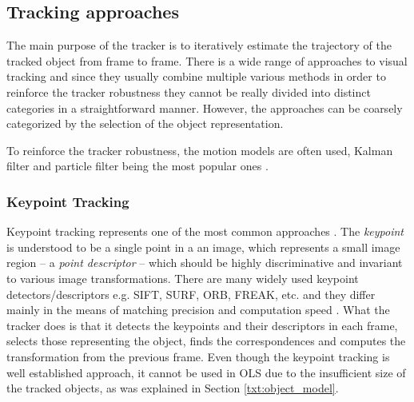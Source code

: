 \subsection{Tracking approaches}

The main purpose of the tracker is to iteratively estimate the trajectory of the tracked object from frame to frame. There is a wide range of approaches to visual tracking and since they usually combine multiple various methods in order to reinforce the tracker robustness they cannot be really divided into distinct categories in a straightforward manner. However, the approaches can be coarsely categorized by the selection of the object representation.

To reinforce the tracker robustness, the motion models are often used, Kalman filter and particle filter being the most popular ones \cite{cuevas2005kalman, ObjectTrackinginMonochromaticVideo}.


\subsubsection*{Keypoint Tracking} 
Keypoint tracking represents one of the most common approaches \cite{Tomasi91detectionand,Nebehay2014WACV}. The \textit{keypoint} is understood to be a single point in a an image, which represents a small image region -- a \textit{point descriptor} -- which should be highly discriminative and invariant to various image transformations. There are many widely used keypoint detectors/descriptors e.g. SIFT, SURF, ORB, FREAK, etc. \cite{sift, Bay:2008:SRF:1370312.1370556, Rublee:2011:OEA:2355573.2356268, Ortiz:2012:FFR:2354409.2354903} and they differ mainly in the means of matching precision and computation speed \cite{Schaeffer_acomparison, conf/icpr/MiksikM12}. What the tracker does is that it detects the keypoints and their descriptors in each frame, selects those representing the object, finds the correspondences and computes the transformation from the previous frame. Even though the keypoint tracking is well established approach, it cannot be used in OLS due to the insufficient size of the tracked objects, as was explained in Section \ref{txt:object_model}.


